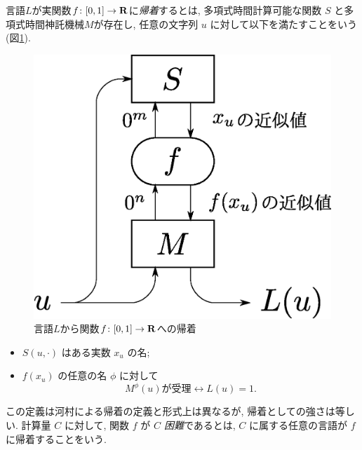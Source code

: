 \begin{definition}[帰着]
  言語$L$が実関数$f \colon [0, 1] \to \mathbf R$に\emph{帰着}するとは, 
  多項式時間計算可能な関数 $S$ と多項式時間神託機械$M$が存在し, 
  任意の文字列 $u$ に対して以下を満たすことをいう(図\ref{fig:reduction}). 
 \begin{figure}
  \begin{center}
  \includegraphics[scale=0.25]{image/reduction.eps}
  \caption{言語$L$から関数$f \colon [0,1] \to \mathbf R$への帰着}
  \label{fig:reduction}
  \end{center}
 \end{figure}
  \begin{itemize}
   \item $S(u, \cdot)$ はある実数 $x_u$ の名;
   \item $f(x_u)$ の任意の名 $\phi$ に対して
	 \[
	  M^\phi(u) \text{が受理} \leftrightarrow L(u) = 1.
	 \]
  \end{itemize}
\end{definition}
この定義は河村による帰着の定義と形式上は異なるが,
帰着としての強さは等しい.
計算量 $C$ に対して, 関数 $f$ が \emph{$C$ 困難}であるとは,
$C$ に属する任意の言語が $f$ に帰着することをいう.
